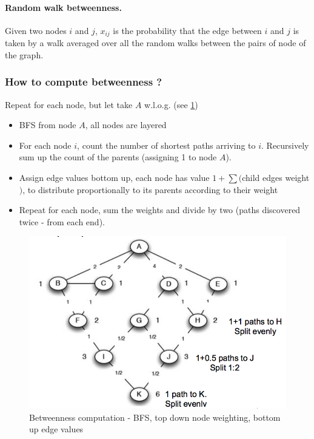 \paragraph{Random walk betweenness.}
  Given two nodes $i$ and $j$, $x_{ij}$ is the probability that the edge between $i$ and $j$ is taken by a walk averaged over all the random walks between the pairs of node of the graph.


\subsubsection{How to compute betweenness ?} 

Repeat for each node, but let take $A$ w.l.o.g. (see \cref{fig:betweenness})

\begin{itemize}
  \item BFS from node $A$, all nodes are layered
  \item For each node $i$, count the number of shortest paths arriving to $i$. Recursively sum up the count of the parents (assigning 1 to node $A$).
  \item Assign edge values bottom up, each node has value $1 + \sum ($child edges weight$)$, to distribute proportionally to its parents according to their weight
  \item Repeat for each node, sum the weights and divide by two (paths discovered twice - from each end).
\end{itemize}


\begin{figure}
  \centering
  \includegraphics[width=1\linewidth]{figures/betweenness_computation.png}
  \caption{Betweenness computation - BFS, top down node weighting, bottom up edge values}
  \label{fig:betweenness}
\end{figure}

